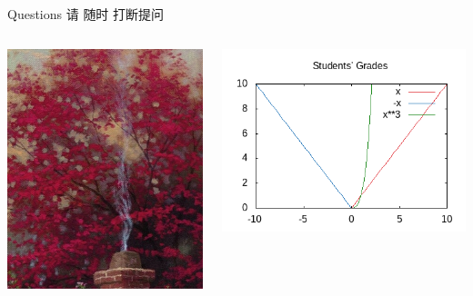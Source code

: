 \documentclass[presentation]{beamer}
\begin{document}
\begin{frame}[label={sec:org79997d7}]{Questions}
请 \alert{随时} 打断提问
\begin{columns}
\begin{column}{0.45\columnwidth}
\begin{block}{}
\begin{center}
\includegraphics[width=.9\linewidth]{imgs/avatar.png}
\end{center}
\end{block}
\end{column}
\begin{column}{0.45\columnwidth}
\begin{block}{}
\begin{center}
\includegraphics[width=.9\linewidth]{imgs/grades.png}
\end{center}
\end{block}
\end{column}
\end{columns}
\end{frame}
\end{document}

